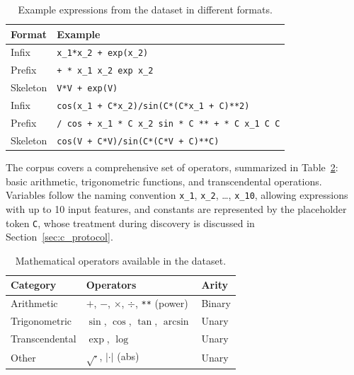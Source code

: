 \begin{table}[htbp]
    \centering
    \caption{Example expressions from the dataset in different formats.}
    \label{tab:dataset_examples}
    \begin{tabular}{p{2.5cm}p{10cm}}
    \toprule
    \textbf{Format} & \textbf{Example} \\
    \midrule
    Infix & \texttt{x\_1*x\_2 + exp(x\_2)} \\
    Prefix & \texttt{+ * x\_1 x\_2 exp x\_2} \\
    Skeleton & \texttt{V*V + exp(V)} \\
    \midrule
    Infix & \texttt{cos(x\_1 + C*x\_2)/sin(C*(C*x\_1 + C)**2)} \\
    Prefix & \texttt{/ cos + x\_1 * C x\_2 sin * C ** + * C x\_1 C C} \\
    Skeleton & \texttt{cos(V + C*V)/sin(C*(C*V + C)**C)} \\
    \bottomrule
    \end{tabular}
\end{table}

The corpus covers a comprehensive set of operators, summarized in Table~\ref{tab:operators}: basic arithmetic, trigonometric functions, and transcendental operations. Variables follow the naming convention \texttt{x\_1}, \texttt{x\_2}, \ldots, \texttt{x\_10}, allowing expressions with up to 10 input features, and constants are represented by the placeholder token \texttt{C}, whose treatment during discovery is discussed in Section~\ref{sec:c_protocol}.

\begin{table}[htbp]
    \centering
    \caption{Mathematical operators available in the dataset.}
    \label{tab:operators}
    \begin{tabular}{lll}
    \toprule
    \textbf{Category} & \textbf{Operators} & \textbf{Arity} \\
    \midrule
    Arithmetic & $+$, $-$, $\times$, $\div$, \texttt{**} (power) & Binary \\
    Trigonometric & $\sin$, $\cos$, $\tan$, $\arcsin$ & Unary \\
    Transcendental & $\exp$, $\log$ & Unary \\
    Other & $\sqrt{\cdot}$, $|\cdot|$ (abs) & Unary \\
    \bottomrule
    \end{tabular}
\end{table}

